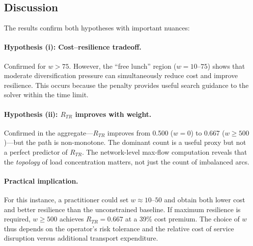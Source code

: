 \documentclass{article}
\begin{document}
\subsection{Discussion}

The results confirm both hypotheses with important nuances:

\paragraph{Hypothesis (i): Cost--resilience tradeoff.} Confirmed for $w > 75$. However, the ``free lunch'' region ($w = 10$--$75$) shows that moderate diversification pressure can simultaneously reduce cost and improve resilience. This occurs because the penalty provides useful search guidance to the solver within the time limit.

\paragraph{Hypothesis (ii): $R_{TR}$ improves with weight.} Confirmed in the aggregate---$R_{TR}$ improves from 0.500 ($w=0$) to 0.667 ($w \geq 500$)---but the path is non-monotone. The dominant count is a useful proxy but not a perfect predictor of $R_{TR}$. The network-level max-flow computation reveals that the \emph{topology} of load concentration matters, not just the count of imbalanced arcs.

\paragraph{Practical implication.} For this instance, a practitioner could set $w \approx 10$--$50$ and obtain both lower cost and better resilience than the unconstrained baseline. If maximum resilience is required, $w \geq 500$ achieves $R_{TR} = 0.667$ at a 39\% cost premium. The choice of $w$ thus depends on the operator's risk tolerance and the relative cost of service disruption versus additional transport expenditure.
\end{document}
